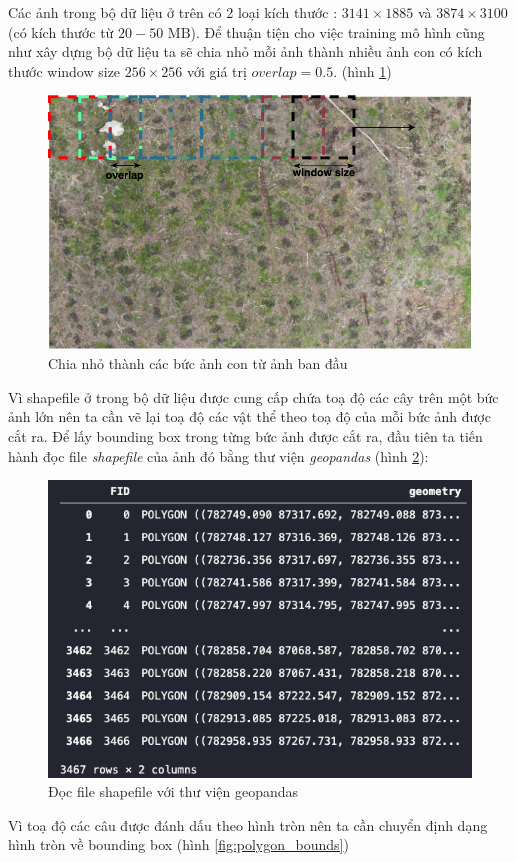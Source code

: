 \documentclass[a4paper, 12pt]{report}
\begin{document}
%
Các ảnh trong bộ dữ liệu ở trên có 2 loại kích thước : $3141 \times 1885$ và $3874 \times 3100$ (có kích thước từ $20 - 50 \textrm{ MB}$).  Để thuận tiện cho việc training mô hình cũng như xây dựng bộ dữ liệu  ta sẽ chia nhỏ mỗi ảnh thành nhiều ảnh con có kích thước window size $256 \times 256$ với giá trị $overlap = 0.5$. (hình \ref{fig:demo_prepare_data}) \\
 \begin{figure}[!htb]
	\centering
	\includegraphics[width=1\linewidth]{Images/demo_prepare_data}
	\caption{Chia nhỏ thành các bức ảnh con từ ảnh ban đầu}
	\label{fig:demo_prepare_data}
\end{figure}
Vì shapefile ở trong bộ dữ liệu được cung cấp chứa toạ độ các cây trên một bức ảnh lớn nên ta cần vẽ lại toạ độ các vật thể theo toạ độ của mỗi bức ảnh được cắt ra. Để lấy bounding box trong từng bức ảnh được cắt ra,  đầu tiên ta tiến hành đọc file \textit{shapefile} của ảnh đó bằng thư viện \textit{geopandas} (hình \ref{fig:polygon_ori}): 

 \begin{figure}[!htb]
	\centering
	\includegraphics[width=1\linewidth]{Images/polygon_ori}
	\caption{Đọc file shapefile với thư viện geopandas}
	\label{fig:polygon_ori}
\end{figure}
Vì toạ độ các câu được đánh dấu theo hình tròn nên ta cần chuyển định dạng hình tròn về bounding box (hình \ref{fig:polygon_bounds})
\end{document}
